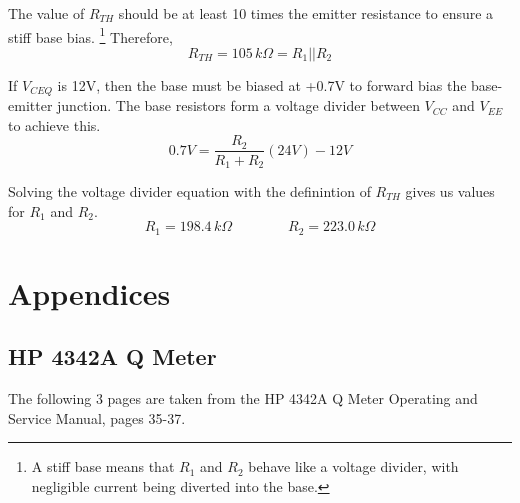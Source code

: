 \documentclass[titlepage, letterpaper, 11pt]{article}
\begin{document}
The value of $R_{TH}$ should be at least 10 times the emitter
resistance to ensure a stiff base bias. \footnote{A stiff base means
that $R_{1}$ and $R_{2}$ behave like a voltage divider, with 
negligible current being diverted into the base.} Therefore,
\begin{equation*}
R_{TH}=105\,k\Omega=R_{1}||R_{2}
\end{equation*}

If $V_{CEQ}$ is 12V, then the base must be biased at +0.7V to forward
bias the base-emitter junction. The base resistors form a voltage
divider between $V_{CC}$ and $V_{EE}$ to achieve this.
\begin{equation*}
0.7V=\frac{R_{2}}{R_{1}+R_{2}}(24V)-12V
\end{equation*}

Solving the voltage divider equation with the definintion of $R_{TH}$
gives us values for $R_{1}$ and $R_{2}$.
\begin{equation*}
R_{1}=198.4\,k\Omega\qquad\qquad R_{2}=223.0\,k\Omega
\end{equation*}

\section{Appendices}

\subsection{HP 4342A Q Meter}
\label{qMeter}

The following 3 pages are taken from the HP 4342A Q Meter Operating
and Service Manual, pages 35-37.
\end{document}
